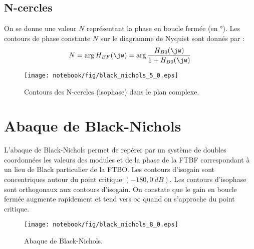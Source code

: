 \subsection{N-cercles}
On se donne une valeur $N$ représentant la phase en boucle fermée 
(en \si{\degree}). Les contours de phase constante $N$ sur le diagramme 
de Nyquist sont donnés par :
\[
    N=\arg{H_{BF}(\jw)}=\arg{\dfrac{H_{B0}(\jw)}{1+H_{B0}(\jw)}}
\]
\begin{figure}[!h]
    \begin{center}
        \texttt{[image: notebook/fig/black\_nichols\_5\_0.eps]}
    \end{center}
    \caption{Contours des N-cercles (isophase) dans le plan complexe.}
\end{figure}
\clearpage
\section{Abaque de Black-Nichols}
L'abaque de Black-Nichols permet de repérer par un système de doubles 
coordonnées les valeurs des modules et de la phase de la FTBF correspondant à 
un lieu de Black particulier de la FTBO. Les contours d'isogain sont 
concentriques autour du point critique $(-180,\SI{0}{dB})$. Les contours 
d'isophase sont orthogonaux aux contours d'isogain.
On constate que le gain en boucle fermée augmente rapidement et tend vers 
$\infty$ quand on s'approche du point critique.
\begin{figure}[!h]
\begin{center}
    \texttt{[image: notebook/fig/black\_nichols\_8\_0.eps]}
\end{center}
    \caption{Abaque de Black-Nichols.}
\end{figure}
\clearpage
